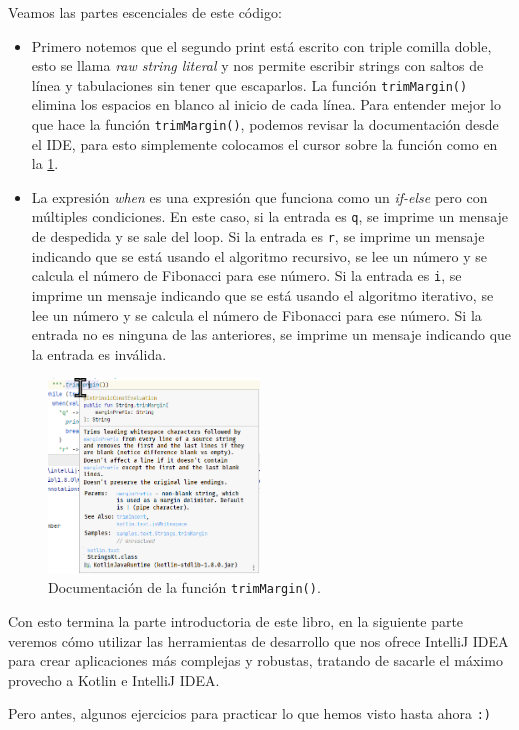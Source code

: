   Veamos las partes escenciales de este código:

  \begin{itemize}
    \item Primero notemos que el segundo print está escrito con triple comilla doble, esto se llama
      \textit{raw string literal} y nos permite escribir strings con saltos de línea y tabulaciones
      sin tener que escaparlos.
      La función \texttt{trimMargin()} elimina los espacios en blanco al inicio de cada línea.
      Para entender mejor lo que hace la función \texttt{trimMargin()}, podemos revisar la 
      documentación desde el IDE, para esto simplemente colocamos el cursor sobre la función como
      en la \cref{fig:trimMargin}.
    \item La expresión \textit{when} es una expresión que funciona como un \textit{if-else} pero con
      múltiples condiciones.
      En este caso, si la entrada es \texttt{q}, se imprime un mensaje de despedida y se sale del
      loop.
      Si la entrada es \texttt{r}, se imprime un mensaje indicando que se está usando el algoritmo
      recursivo, se lee un número y se calcula el número de Fibonacci para ese número.
      Si la entrada es \texttt{i}, se imprime un mensaje indicando que se está usando el algoritmo
      iterativo, se lee un número y se calcula el número de Fibonacci para ese número.
      Si la entrada no es ninguna de las anteriores, se imprime un mensaje indicando que la entrada
      es inválida.
  \end{itemize}

  \begin{figure}[ht!]
    \centering
    \includegraphics[width=0.5\textwidth]{img/Por_algo_se_empieza/trimMargin.png}
    \caption{Documentación de la función \texttt{trimMargin()}.}
    \label{fig:trimMargin}
  \end{figure}

  Con esto termina la parte introductoria de este libro, en la siguiente parte veremos cómo
  utilizar las herramientas de desarrollo que nos ofrece IntelliJ IDEA para crear aplicaciones
  más complejas y robustas, tratando de sacarle el máximo provecho a Kotlin e IntelliJ IDEA.

  Pero antes, algunos ejercicios para practicar lo que hemos visto hasta ahora \texttt{:)}
